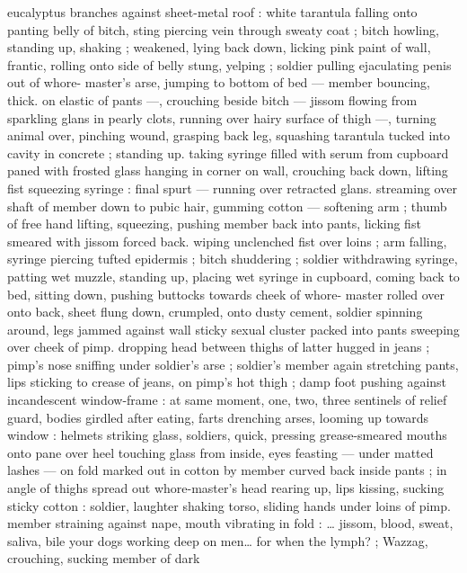 eucalyptus branches against sheet-metal roof : white tarantula 
falling onto panting belly of bitch, sting piercing vein through sweaty 
coat ; bitch howling, standing up, shaking ; weakened, lying back 
down, licking pink paint of wall, frantic, rolling onto side of belly 
stung, yelping ; soldier pulling ejaculating penis out of whore- 
master's arse, jumping to bottom of bed --- member bouncing, thick. 
on elastic of pants ---, crouching beside bitch --- jissom flowing from 
sparkling glans in pearly clots, running over hairy surface of thigh 
---, turning animal over, pinching wound, grasping back leg, 
squashing tarantula tucked into cavity in concrete ; standing up. 
taking syringe filled with serum from cupboard paned with frosted 
glass hanging in corner on wall, crouching back down, lifting fist 
squeezing syringe : final spurt --- running over retracted glans. 
streaming over shaft of member down to pubic hair, gumming cotton 
--- softening arm ; thumb of free hand lifting, squeezing, pushing 
member back into pants, licking fist smeared with jissom forced back. 
wiping unclenched fist over loins ; arm falling, syringe piercing tufted 
epidermis ; bitch shuddering ; soldier withdrawing syringe, patting 
wet muzzle, standing up, placing wet syringe in cupboard, coming 
back to bed, sitting down, pushing buttocks towards cheek of whore- 
master rolled over onto back, sheet flung down, crumpled, onto 
dusty cement, soldier spinning around, legs jammed against wall 
sticky sexual cluster packed into pants sweeping over cheek of pimp. 
dropping head between thighs of latter hugged in jeans ; pimp's 
nose sniffing under soldier's arse ; soldier's member again 
stretching pants, lips sticking to crease of jeans, on pimp's hot thigh 
; damp foot pushing against incandescent window-frame : at same 
moment, one, two, three sentinels of relief guard, bodies girdled 
after eating, farts drenching arses, looming up towards window : 
helmets striking glass, soldiers, quick, pressing grease-smeared 
mouths onto pane over heel touching glass from inside, eyes 
feasting --- under matted lashes --- on fold marked out in cotton by 
member curved back inside pants ; in angle of thighs spread out 
whore-master's head rearing up, lips kissing, sucking sticky cotton : 
soldier, laughter shaking torso, sliding hands under loins of pimp. 
member straining against nape, mouth vibrating in fold : {\ldots} {\gl} jissom, 
blood, sweat, saliva, bile{\td} your dogs working deep on men{\ldots} for 
when the lymph?{\td} {\gr} ; Wazzag, crouching, sucking member of dark 
